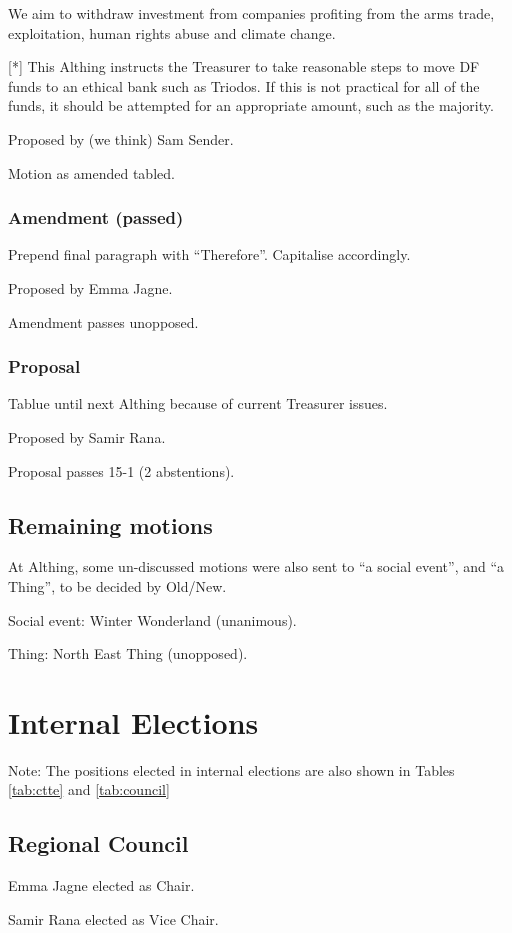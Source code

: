 \documentclass[a4paper, 12pt]{article}
\begin{document}
We aim to withdraw investment from companies profiting from the arms trade, exploitation, human rights abuse and climate change.

[*] This Althing instructs the Treasurer to take reasonable steps to move DF funds to an ethical bank such as Triodos. If this is not practical for all of the funds, it should be attempted for an appropriate amount, such as the majority.

Proposed by (we think) Sam Sender.

Motion as amended tabled.

\subsubsection{Amendment (passed)}
Prepend final paragraph with ``Therefore''. Capitalise accordingly.

Proposed by Emma Jagne.

Amendment passes unopposed.

\subsubsection{Proposal}
Tablue until next Althing because of current Treasurer issues.

Proposed by Samir Rana.

Proposal passes 15-1 (2 abstentions).

\subsection{Remaining motions}
At Althing, some un-discussed motions were also sent to ``a social event'', and ``a Thing'', to be decided by Old/New.

Social event: Winter Wonderland (unanimous).

Thing: North East Thing (unopposed).

\section{Internal Elections}
Note: The positions elected in internal elections are also shown in Tables \ref{tab:ctte} and \ref{tab:council}
\subsection{Regional Council}
Emma Jagne elected as Chair.

Samir Rana elected as Vice Chair.
\end{document}
